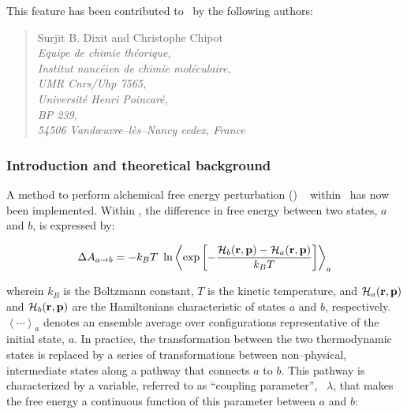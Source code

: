

This feature has been contributed to \NAMD\ by the following authors:

\begin{quote}
   Surjit B. Dixit and Christophe Chipot          \\[0.4cm]
   {\it Equipe de chimie th\'eorique,                 }\\
   {\it Institut nanc\'eien de chimie mol\'eculaire,  }\\
   {\it UMR {\sc Cnrs/Uhp} 7565,                      }\\
   {\it Universit\'e Henri Poincar\'e,                }\\
   {\it BP 239,                                       }\\
   {\it 54506 Vand\oe uvre--l\`es--Nancy cedex, France}
\end{quote}



\subsubsection{Introduction and theoretical background}


A method to perform alchemical free energy perturbation (\FEP)
~\cite{zwan_54_1,Beveridge.89,Gunsteren.89,Straatsma.92,Kollman.93,Gilson.97,
Mark.98,chip_01_1} within \NAMD\ has now been implemented. 
Within \FEP, the difference in free energy between two states,
$a$ and $b$, is expressed by:

\begin{equation}
\Delta A_{a \rightarrow b} = -k_B T \ \ln
\left< \exp\left[-\frac{{\cal H}_b({\bf r}, {\bf p}) - 
                         {\cal H}_a({\bf r}, {\bf p})}
                        {k_B T}\right]
\right>_a
\end{equation}

wherein $k_B$ is the Boltzmann constant, $T$ is the kinetic temperature,
and ${\cal H}_a({\bf r}, {\bf p})$ and ${\cal H}_b({\bf r}, {\bf p})$
are the Hamiltonians characteristic of states $a$ and $b$, respectively.
$\left< \cdots \right>_a$ denotes an ensemble average over configurations
representative of the initial state, $a$.
In practice, the transformation between the two thermodynamic states
is replaced by a series of transformations between non--physical,
intermediate states along a pathway that connects $a$ to $b$.
This pathway is characterized by a variable, referred to as
``coupling parameter'',~\cite{Beveridge.89,Mark.98,king_93_1} 
$\lambda$, that makes the free energy
a continuous function of this parameter between $a$ and $b$:

